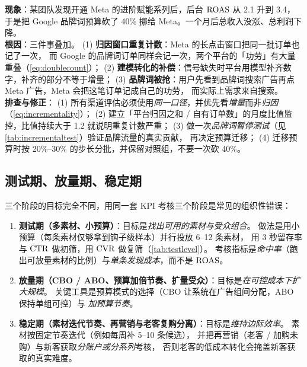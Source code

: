 \begin{pitfall}
\textbf{现象}：某团队发现开通 Meta 的进阶赋能系列后，后台 $\operatorname{ROAS}$ 从 2.1 升到 3.4，
于是把 Google 品牌词预算砍了 40\% 挪给 Meta。一个月后总收入没涨、总利润下降。\\
\textbf{根因}：三件事叠加。
(1) \textbf{归因窗口重复计数}：Meta 的长点击窗口把同一批订单也记了一次，
        而 Google 的品牌词订单同样会记一次，两个平台的「功劳」有大量重叠（\cref{eq:doublecount}）；
(2) \textbf{建模转化的补偿}：信号缺失时平台用模型补齐数字，补齐的部分不等于增量；
(3) \textbf{品牌词被抢}：用户先看到品牌词搜索广告再点 Meta 广告，Meta 会把这笔订单记成自己的功劳，
        而实际上需求来自搜索。\\
\textbf{排查与修正}：
(1) 所有渠道评估必须使用\emph{同一口径}，并优先看\emph{增量}而非\emph{归因}（\cref{eq:incrementality}）；
(2) 建立「平台归因之和 / 自有订单数」的月度比值监控，比值持续大于 1.2 就说明重复计数严重；
(3) 做一次\emph{品牌词暂停测试}（见 \cref{tab:incrementaltest}）验证品牌流量的真实贡献，
        再决定预算迁移；
(4) 迁移预算时按 20\%--30\% 的步长分批，并保留对照组，不要一次砍 40\%。
\end{pitfall}

\subsection{测试期、放量期、稳定期}

三个阶段的目标完全不同，用同一套 KPI 考核三个阶段是常见的组织性错误：

\begin{enumerate}
  \item \textbf{测试期（多素材、小预算）}：目标是\emph{找出可用的素材与受众组合}。
        做法是用小预算（每条素材仅够拿到钩子级样本）并行投放 6--12 条素材，
        用 3 秒留存率与 $\operatorname{CTR}$ 做初筛，用 $\operatorname{CVR}$ 做复筛（\cref{tab:testlevel}）。
        考核指标是\emph{命中率}（跑出可放量素材的比例）与\emph{单条发现成本}，而不是 $\operatorname{ROAS}$。
  \item \textbf{放量期（CBO / ABO、预算加倍节奏、扩量受众）}：目标是\emph{在可控成本下扩大规模}。
        关键工具是预算模式的选择（CBO 让系统在广告组间分配，ABO 保持单组可控）与
        \emph{加预算节奏}。
  \item \textbf{稳定期（素材迭代节奏、再营销与老客复购分离）}：目标是\emph{维持边际效率}。
        素材按固定节奏迭代（例如每周补 5--10 条候选），
        并把再营销（老客 / 加购未购）与新客获取\emph{分账户或分系列}考核，
        否则老客的低成本转化会掩盖新客获取的真实难度。
\end{enumerate}

